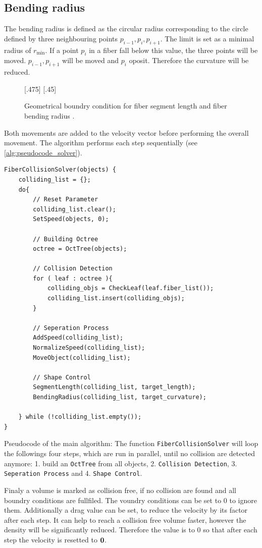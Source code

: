 \subsection{Bending radius}
% 
The bending radius is defined as the circular radius corresponding to the circle defined by three neighbouring points $p_{i-1}, p_{i}, p_{i+1}$. 
The limit is set as a minimal radius of $r_{\min}$.
If a point $p_{i}$ in a fiber fall below this value, the three points will be moved.
$p_{i-1},p_{i+1}$ will be moved \dummy and $p_{i}$ oposit.
Therefore the curvature will be reduced.
% 
\begin{figure}[!t]
    \centering
    \def\tikzheight{.40\textwidth}
    [.475\textwidth]{
    }\hfill
    [.45\textwidth]{
    }
	\caption{Geometrical boundry condition for fiber segment length \segLength and fiber bending radius \segRadius.}
	\label{fig:model_circle}
\end{figure}
% 
\newline
Both movements are added to the velocity vector before performing the overall movement.
The algorithm performs each step sequentially (see \cref{alg:pseudocode_solver}).
% 
\begin{lstfloat}[!tb]
\lstset{style=cpp}
\begin{lstlisting}[]
FiberCollisionSolver(objects) {
	colliding_list = {};
	do{
		// Reset Parameter
		colliding_list.clear();
		SetSpeed(objects, 0);
		
		// Building Octree
		octree = OctTree(objects);
		
		// Collision Detection
		for ( leaf : octree ){
			colliding_objs = CheckLeaf(leaf.fiber_list());
			colliding_list.insert(colliding_objs);
		}
		
		// Seperation Process
		AddSpeed(colliding_list);
		NormalizeSpeed(colliding_list);
		MoveObject(colliding_list);
		
		// Shape Control
		SegmentLength(colliding_list, target_length);
		BendingRadius(colliding_list, target_curvature);
		
	} while (!colliding_list.empty());
}
\end{lstlisting}
\caption{Pseudocode of the main algorithm: The function \texttt{FiberCollisionSolver} will loop the followings four steps, which are run in parallel, until no collision are detected anymore: 1. build an \texttt{OctTree} from all objects, 2. \texttt{Collision Detection}, 3. \texttt{Seperation Process} and 4. \texttt{Shape Control}.}
\label{alg:pseudocode_solver}
\end{lstfloat}
% 
Finaly a volume is marked as collision free, if no collision are found and all boundry conditions are fullfiled. 
The voundry conditions can be set to 0 to ignore them.
Additionally a drag value can be set, to reduce the velocity by its factor after each step.
It can help to reach a collision free volume faster, however the density will be significantly reduced.
Therefore the value is to 0 so that after each step the velocity is resetted to $\mathbf{0}$. 
% 
% 
